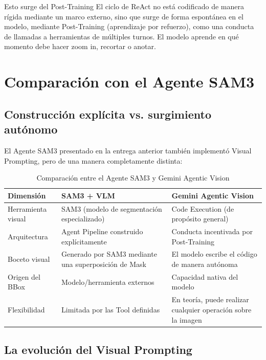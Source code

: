 \documentclass[a4paper]{article}
\begin{document}
\begin{knowledgebox}{Esto surge del Post-Training}
El ciclo de ReAct no está codificado de manera rígida mediante un marco externo, sino que surge de forma espontánea en el modelo, mediante Post-Training (aprendizaje por refuerzo), como una conducta de llamadas a herramientas de múltiples turnos. El modelo aprende en qué momento debe hacer zoom in, recortar o anotar.
\end{knowledgebox}

\section{Comparación con el Agente SAM3}

\subsection{Construcción explícita vs. surgimiento autónomo}

El Agente SAM3 presentado en la entrega anterior también implementó Visual Prompting, pero de una manera completamente distinta:

\begin{table}[H]
\centering
\begin{tabular}{p{3cm}p{5cm}p{5cm}}
\toprule
\textbf{Dimensión} & \textbf{SAM3 + VLM} & \textbf{Gemini Agentic Vision} \\
\midrule
Herramienta visual & SAM3 (modelo de segmentación especializado) & Code Execution (de propósito general) \\
Arquitectura & Agent Pipeline construido explícitamente & Conducta incentivada por Post-Training \\
Boceto visual & Generado por SAM3 mediante una superposición de Mask & El modelo escribe el código de manera autónoma \\
Origen del BBox & Modelo/herramienta externos & Capacidad nativa del modelo \\
Flexibilidad & Limitada por las Tool definidas & En teoría, puede realizar cualquier operación sobre la imagen \\
\bottomrule
\end{tabular}
\caption{Comparación entre el Agente SAM3 y Gemini Agentic Vision}
\end{table}

\subsection{La evolución del Visual Prompting}
\end{document}
